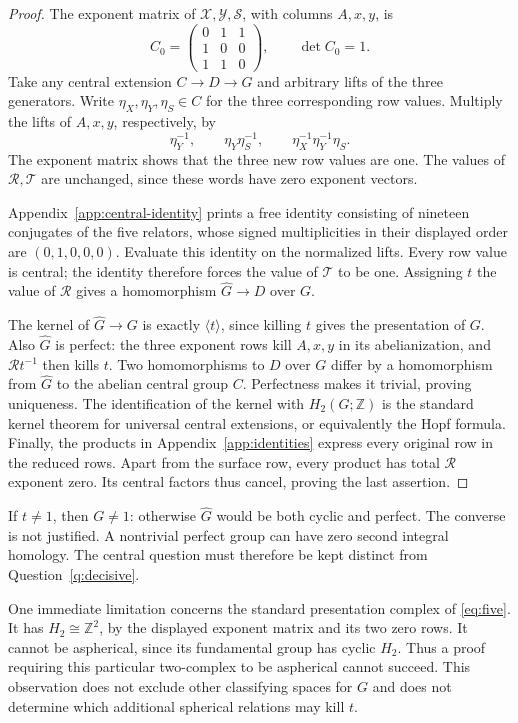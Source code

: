 \documentclass[11pt]{amsart}
\theoremstyle{definition}
\theoremstyle{remark}
\newcommand{\Z}{\mathbb Z}
\begin{document}
\begin{proof}
The exponent matrix of $\mathcal X,\mathcal Y,\mathcal S$, with
columns $A,x,y$, is
\[
 C_0=\begin{pmatrix}0&1&1\\1&0&0\\1&1&0\end{pmatrix},
 \qquad \det C_0=1.
\]
Take any central extension $C\to D\to G$ and arbitrary lifts of
the three generators. Write $\eta_X,\eta_Y,\eta_S\in C$ for
the three corresponding row values. Multiply the lifts of $A,x,y$,
respectively, by
\[
 \eta_Y^{-1},\qquad \eta_Y\eta_S^{-1},\qquad
 \eta_X^{-1}\eta_Y^{-1}\eta_S.
\]
The exponent matrix shows that the three new row values are one.
The values of $\mathcal R,\mathcal T$ are unchanged, since these
words have zero exponent vectors.

Appendix~\ref{app:central-identity} prints a free identity consisting
of nineteen conjugates of the five relators, whose signed multiplicities
in their displayed order are $(0,1,0,0,0)$. Evaluate this identity
on the normalized lifts. Every row value is central; the identity
therefore forces the value of $\mathcal T$ to be one. Assigning $t$
the value of $\mathcal R$ gives a homomorphism $\widehat G\to D$
over $G$.

The kernel of $\widehat G\to G$ is exactly $\langle t\rangle$,
since killing $t$ gives the presentation of $G$. Also $\widehat G$
is perfect: the three exponent rows kill $A,x,y$ in its abelianization,
and $\mathcal Rt^{-1}$ then kills $t$. Two homomorphisms to $D$
over $G$ differ by a homomorphism from $\widehat G$ to the abelian
central group $C$. Perfectness makes it trivial, proving uniqueness.
The identification of the kernel with $H_2(G;\Z)$ is the standard
kernel theorem for universal central extensions, or equivalently the
Hopf formula. Finally, the products in Appendix~\ref{app:identities}
express every original row in the reduced rows. Apart from the surface
row, every product has total $\mathcal R$ exponent zero. Its central
factors thus cancel, proving the last assertion.
\end{proof}

If $t\ne1$, then $G\ne1$: otherwise $\widehat G$ would be both
cyclic and perfect. The converse is not justified. A nontrivial perfect
group can have zero second integral homology. The central question must
therefore be kept distinct from Question~\ref{q:decisive}.

One immediate limitation concerns the standard presentation complex
of \eqref{eq:five}. It has $H_2\cong\Z^2$, by the displayed exponent
matrix and its two zero rows. It cannot be aspherical, since its
fundamental group has cyclic $H_2$. Thus a proof requiring this
particular two-complex to be aspherical cannot succeed. This observation
does not exclude other classifying spaces for $G$ and does not determine
which additional spherical relations may kill $t$.
\end{document}
